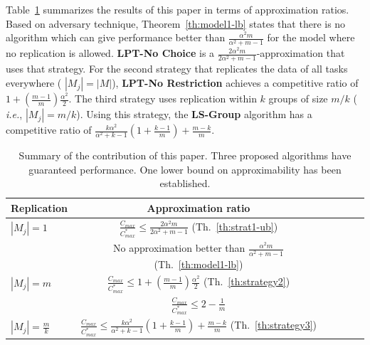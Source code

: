\documentclass[twocolumn]{svjour3}
\begin{document}
Table~\ref{tab:template} summarizes the results of this paper in terms
of approximation ratios. Based on adversary technique,
Theorem~\ref{th:model1-lb} states that there is no algorithm which can
give performance better than $\frac{\alpha^{2}m }{\alpha^{2} + m-1}$ for the model where no
replication is allowed. {\bf LPT-No Choice} is a
$\frac{2\alpha^{2}m}{2\alpha^{2}+ m-1}$-approximation that uses that
strategy. For the second strategy that replicates the data of all
tasks everywhere ( $|M_j| = |M|$), {\bf LPT-No Restriction} achieves a
competitive ratio of $1 + (\frac{m-1}{m})\frac{\alpha^{2}}{2}$.  The
third strategy uses replication within $k$ groups of size $m/k$ ({\em
  i.e.}, $|M_j| = m/k$). Using this strategy, the {\bf LS-Group}
algorithm has a competitive ratio of
$\frac{k\alpha^{2}}{\alpha^{2}+k-1}\left( 1+ {\frac{k-1}{m}} \right) +
{\frac{m-k}{m}}$.



\begin{table}[ht]
  \centering
  \begin{tabular}{|l|c|c|c|c|c|}
    \hline
    Replication & Approximation ratio  \\
    \hline
    $|M_j|=1$ & $\frac{C_{max}}{C_{max}^{*}}\leq \frac{2\alpha^{2}m}{2\alpha^{2}+ m-1}$ (Th.~\ref{th:strat1-ub})  \\
    & No approximation better than $\frac{\alpha^{2}m }{\alpha^{2} + m-1}$ (Th.~\ref{th:model1-lb})   \\
    
    \hline
    $|M_j|=m$ & $\frac{C_{max}}{C_{max}^{*}} \leq 1 + (\frac{m-1}{m})\frac{\alpha^{2}}{2}$ (Th.~\ref{th:strategy2})  \\
    & $\frac{C_{max}}{C_{max}^{*}} \leq 2-\frac{1}{m}$ \cite{Graham66}   \\
    \hline
    
    $|M_j|= \frac{m}{k} $ & $\frac{C_{max}}{C_{max}^{*}} \leq \frac{k\alpha^{2}}{\alpha^{2}+k-1} \left(1+ {\frac{k-1}{m}} \right)+ {\frac{m-k}{m}}$ (Th.~\ref{th:strategy3})  \\
    
    \hline
  \end{tabular}
  \caption{Summary of the contribution of this paper.
    Three proposed algorithms have guaranteed performance.
    One lower bound on approximability has been established.}
  \label{tab:template}
\end{table}
\end{document}
